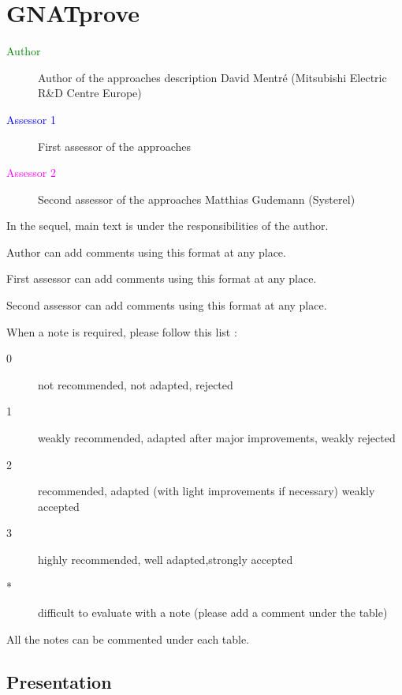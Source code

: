\chapter{GNATprove}

\begin{description}
\item[\textcolor{green}{Author}] Author of the approaches description
  David Mentré (Mitsubishi Electric R\&D Centre Europe)
\item[\textcolor{blue}{Assessor 1}] First assessor of the approaches 
\item[\textcolor{magenta}{Assessor 2}] Second assessor of the approaches Matthias Gudemann (Systerel)
\end{description}

In the sequel, main text is under the responsibilities of the author.

\begin{author_comment}
Author can add comments using this format at any place.
\end{author_comment}

\begin{assessor1}
First assessor can add comments using this format at any place.
\end{assessor1}

\begin{assessor2}
Second assessor can add comments using this format at any place.
\end{assessor2}

When a note is required, please follow this list :
\begin{description}
\item[0] not recommended, not adapted, rejected
\item[1] weakly recommended, adapted after major improvements, weakly rejected
\item[2] recommended, adapted (with light improvements if necessary)  weakly accepted
\item[3] highly recommended, well adapted,strongly accepted
\item[*] difficult to evaluate with a note (please add a comment under the table)
\end{description}

All the notes can be commented under each table.

\section{Presentation}

